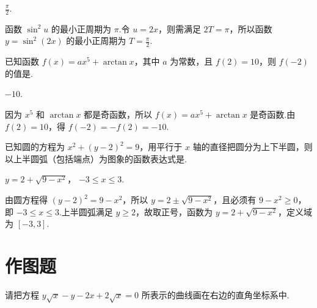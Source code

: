 \begin{answer}
\(\displaystyle \frac{\pi}{2}\).
\end{answer}

\begin{solution}
函数 \(\sin^{2}u\) 的最小正周期为 \(\pi\).令 \(u=2x\)，则需满足 \(2T=\pi\)，所以函数 \(y=\sin^{2}(2x)\) 的最小正周期为 \(\displaystyle T=\frac\pi2\).
\end{solution}

\begin{problem}

已知函数 \(f(x) = ax^5 + \arctan x \)，其中 \(a \) 为常数，且 \(f(2) = 10 \)，则 \(f(-2) \) 的值是\fillinblank{}.
\end{problem}

\begin{answer}
\(-10\).
\end{answer}

\begin{solution}
因为 \(x^{5}\) 和 \(\arctan x\) 都是奇函数，所以 \(f(x)=ax^{5}+\arctan x\) 是奇函数.由 \(f(2)=10\)，得 \(f(-2)=-f(2)=-10\).
\end{solution}

\begin{problem}

已知圆的方程为 \(x^2 + (y - 2)^2 = 9 \)，用平行于 \(x \) 轴的直径把圆分为上下半圆，则以上半圆弧（包括端点）为图象的函数表达式是\fillinblank{}.
\end{problem}

\begin{answer}
\(y=2+\sqrt{9-x^{2}}\)， \( -3\leqslant x\leqslant 3\).
\end{answer}

\begin{solution}
由圆方程得 \((y-2)^{2}=9-x^{2}\)，所以 \(y=2\pm\sqrt{9-x^{2}}\)，且必须有 \(9-x^{2}\geqslant0\)，即 \(-3\leqslant x\leqslant3\).上半圆弧满足 \(y\geqslant2\)，故取正号，函数为 \(y=2+\sqrt{9-x^{2}}\)，定义域为 \([-3,3]\).
\end{solution}

\section{作图题}

\begin{problem}

请把方程 \(y\sqrt{x} - y - 2x + 2\sqrt{x} = 0 \) 所表示的曲线画在右边的直角坐标系中.

\end{problem}

